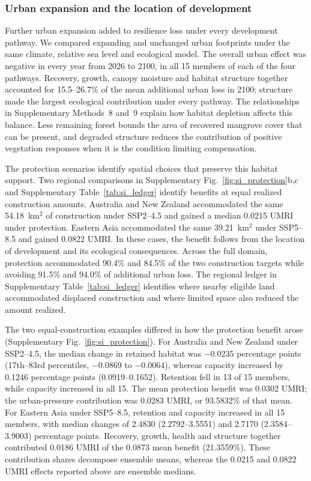 \subsubsection{Urban expansion and the location of development}

Further urban expansion added to resilience loss under every development pathway. We compared expanding and unchanged urban footprints under the same climate, relative sea level and ecological model. The overall urban effect was negative in every year from 2026 to 2100, in all 15 members of each of the four pathways. Recovery, growth, canopy moisture and habitat structure together accounted for 15.5--26.7\% of the mean additional urban loss in 2100; structure made the largest ecological contribution under every pathway. The relationships in Supplementary Methods~8 and~9 explain how habitat depletion affects this balance. Less remaining forest bounds the area of recovered mangrove cover that can be present, and degraded structure reduces the contribution of positive vegetation responses when it is the condition limiting compensation.

The protection scenarios identify spatial choices that preserve this habitat support. Two regional comparisons in Supplementary Fig.~\ref{fig:si_protection}b,c and Supplementary Table~\ref{tab:si_ledger} identify benefits at equal realized construction amounts. Australia and New Zealand accommodated the same 54.18~km$^2$ of construction under SSP2--4.5 and gained a median 0.0215 UMRI under protection. Eastern Asia accommodated the same 39.21~km$^2$ under SSP5--8.5 and gained 0.0822 UMRI. In these cases, the benefit follows from the location of development and its ecological consequences. Across the full domain, protection accommodated 90.4\% and 84.5\% of the two construction targets while avoiding 91.5\% and 94.0\% of additional urban loss. The regional ledger in Supplementary Table~\ref{tab:si_ledger} identifies where nearby eligible land accommodated displaced construction and where limited space also reduced the amount realized.

The two equal-construction examples differed in how the protection benefit arose (Supplementary Fig.~\ref{fig:si_protection}). For Australia and New Zealand under SSP2--4.5, the median change in retained habitat was $-0.0235$ percentage points (17th--83rd percentiles, $-0.0869$ to $-0.0064$), whereas capacity increased by 0.1246 percentage points (0.0919--0.1652). Retention fell in 13 of 15 members, while capacity increased in all 15. The mean protection benefit was 0.0302 UMRI; the urban-pressure contribution was 0.0283 UMRI, or 93.5832\% of that mean. For Eastern Asia under SSP5--8.5, retention and capacity increased in all 15 members, with median changes of 2.4830 (2.2792--3.5551) and 2.7170 (2.3584--3.9003) percentage points. Recovery, growth, health and structure together contributed 0.0186 UMRI of the 0.0873 mean benefit (21.3559\%). These contribution shares decompose ensemble means, whereas the 0.0215 and 0.0822 UMRI effects reported above are ensemble medians.

